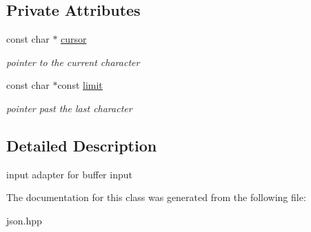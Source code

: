 \subsection*{Private Attributes}
\begin{DoxyCompactItemize}
\item 
\mbox{\label{classnlohmann_1_1detail_1_1input__buffer__adapter_a49e6c8b6555af489a45ef51737eafa1c}} 
const char $\ast$ \mbox{\hyperlink{classnlohmann_1_1detail_1_1input__buffer__adapter_a49e6c8b6555af489a45ef51737eafa1c}{cursor}}
\begin{DoxyCompactList}\small\item\em pointer to the current character \end{DoxyCompactList}\item 
\mbox{\label{classnlohmann_1_1detail_1_1input__buffer__adapter_abbea9cdb1862e55bc1e142a72a947da4}} 
const char $\ast$const \mbox{\hyperlink{classnlohmann_1_1detail_1_1input__buffer__adapter_abbea9cdb1862e55bc1e142a72a947da4}{limit}}
\begin{DoxyCompactList}\small\item\em pointer past the last character \end{DoxyCompactList}\end{DoxyCompactItemize}


\subsection{Detailed Description}
input adapter for buffer input 

The documentation for this class was generated from the following file\+:\begin{DoxyCompactItemize}
\item 
json.\+hpp\end{DoxyCompactItemize}
